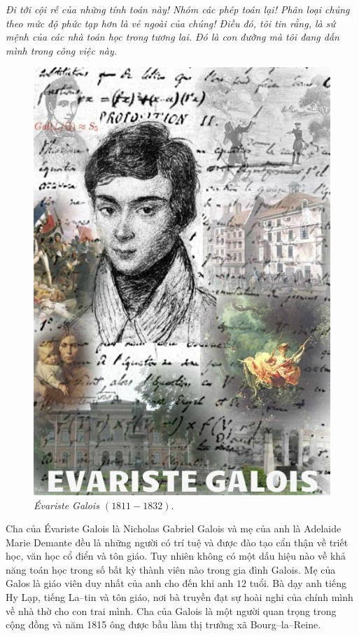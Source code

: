 \begin{multicols}{2}
	\textit{Đi tới cội rễ của những tính toán này! Nhóm các phép toán lại! Phân loại chúng theo mức độ phức tạp hơn là vẻ ngoài của chúng! Điều đó, tôi tin rằng,  là sứ mệnh của các nhà toán học trong tương lai. Đó là con đường mà tôi đang dấn mình trong công việc này.}
	\begin{figure}[H]
		\vspace*{-5pt}
		\centering
		\captionsetup{labelformat= empty, justification=centering}
		\includegraphics[width= 0.6\linewidth]{1}
		\caption{\small\textit{\color{lichsutoanhoc}Évariste Galois
				$(1811-1832).$}}
		\vspace*{-10pt}
	\end{figure}
	Cha của Évariste Galois là Nicholas Gabriel Galois và mẹ của anh là Adelaide Marie Demante đều là những người có trí tuệ và được đào tạo cẩn thận về triết học, văn học cổ điển và tôn giáo. Tuy nhiên không có một dấu hiệu nào về khả năng toán học trong số bất kỳ thành viên nào trong gia đình Galois. Mẹ của Galos là giáo viên duy nhất của anh cho đến khi anh $12$ tuổi. Bà dạy anh tiếng Hy Lạp, tiếng La--tin và tôn giáo, nơi bà truyền đạt sự hoài nghi của chính mình về nhà thờ cho con trai mình. Cha của Galois là một người quan trọng trong cộng đồng và năm 1815 ông được bầu làm thị trưởng xã Bourg--la--Reine.
	\begin{figure}[H]
		\vspace*{-5pt}
		\centering
		\captionsetup{labelformat= empty, justification=centering}

\end{figure}
\end{multicols}
